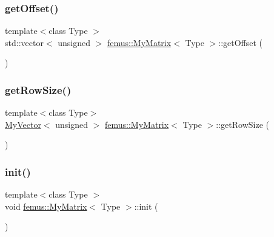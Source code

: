 \mbox{\label{classfemus_1_1_my_matrix_a11b7703db1e6021af689380608f38faa}} 
\subsubsection{\texorpdfstring{get\+Offset()}{getOffset()}}
{\footnotesize\ttfamily template$<$class Type $>$ \\
std\+::vector$<$ unsigned $>$ \mbox{\hyperlink{classfemus_1_1_my_matrix}{femus\+::\+My\+Matrix}}$<$ Type $>$\+::get\+Offset (\begin{DoxyParamCaption}{ }\end{DoxyParamCaption})}

\mbox{\label{classfemus_1_1_my_matrix_a8b9f22c56f93c4906febf8b4fd626ce3}} 
\subsubsection{\texorpdfstring{get\+Row\+Size()}{getRowSize()}}
{\footnotesize\ttfamily template$<$class Type$>$ \\
\mbox{\hyperlink{classfemus_1_1_my_vector}{My\+Vector}}$<$ unsigned $>$ \mbox{\hyperlink{classfemus_1_1_my_matrix}{femus\+::\+My\+Matrix}}$<$ Type $>$\+::get\+Row\+Size (\begin{DoxyParamCaption}{ }\end{DoxyParamCaption})\hspace{0.3cm}{\ttfamily [inline]}}

\mbox{\label{classfemus_1_1_my_matrix_abf86f6c2ce5cfb335048ed948acd6d71}} 
\subsubsection{\texorpdfstring{init()}{init()}}
{\footnotesize\ttfamily template$<$class Type $>$ \\
void \mbox{\hyperlink{classfemus_1_1_my_matrix}{femus\+::\+My\+Matrix}}$<$ Type $>$\+::init (\begin{DoxyParamCaption}{ }\end{DoxyParamCaption})}

